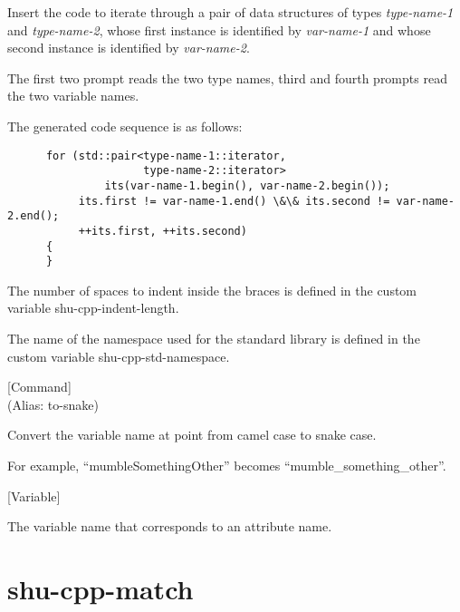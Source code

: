 \begin{doc-string}
Insert the code to iterate through a pair of data structures of types
\emph{type-name-1} and \emph{type-name-2}, whose first instance is identified by \emph{var-name-1}
and whose second instance is identified by \emph{var-name-2}.

The first two prompt reads the two type names, third and fourth prompts read the
two variable names.

The generated code sequence is as follows:

\small{\begin{verbatim}
      for (std::pair<type-name-1::iterator,
                     type-name-2::iterator>
               its(var-name-1.begin(), var-name-2.begin());
           its.first != var-name-1.end() \&\& its.second != var-name-2.end();
           ++its.first, ++its.second)
      {
      }
\end{verbatim}}

The number of spaces to indent inside the braces is defined in the custom
variable shu-cpp-indent-length.

The name of the namespace used for the standard library is defined in the custom
variable shu-cpp-std-namespace.
\end{doc-string}

\vspace{1em}
\noindent
{}
\usebox{\funcname}
 \hfill [Command]\\%
 (Alias: to-snake)

\begin{doc-string}
Convert the variable name at point from camel case to snake case.

For example, ``mumbleSomethingOther'' becomes ``mumble\_something\_other''.
\end{doc-string}

\vspace{1em}
\noindent
{}
\usebox{\funcname}
 \hfill [Variable]

\begin{doc-string}
The variable name that corresponds to an attribute name.
\end{doc-string}

\eject
\section{shu-cpp-match}


